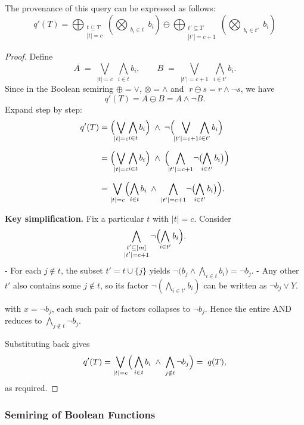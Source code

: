 \documentclass[twocolumn]{article}
\begin{document}
The provenance of this query can be expressed as follows:
\[
q'(T) = \bigoplus_{\substack{t\subseteq T \\ |t| = c}}\left(\bigotimes_{\substack{b_i\in t}}b_i\right) \ominus \bigoplus_{\substack{t'\subseteq T \\ |t'| = c+1}}\left(\bigotimes_{\substack{b_i\in t'}}b_i\right)
\]

\begin{proof}
Define
\[
A \;=\; \bigvee_{\lvert t\rvert = c}\;\bigwedge_{i\in t} b_i,
\qquad
B \;=\; \bigvee_{\lvert t'\rvert = c+1}\;\bigwedge_{i\in t'} b_i.
\]
Since in the Boolean semiring \(\oplus=\vee\), \(\otimes=\wedge\) and
\(\;r\ominus s = r\wedge\neg s\), we have
\[
q'(T)
= A \ominus B
= A \wedge \neg B.
\]
Expand step by step:
\begin{align*}
q'(T)
&= \Bigl(\!\bigvee_{\lvert t\rvert = c}\!\bigwedge_{i\in t}b_i\Bigr)
   \;\wedge\;
   \neg\Bigl(\!\bigvee_{\lvert t'\rvert = c+1}\!\bigwedge_{i\in t'}b_i\Bigr)\\[6pt]
&= \Bigl(\!\bigvee_{\lvert t\rvert = c}\!\bigwedge_{i\in t}b_i\Bigr)
   \;\wedge\;
   \Bigl(\!\bigwedge_{\lvert t'\rvert = c+1}\!\neg\bigl(\!\bigwedge_{i\in t'}b_i\bigr)\Bigr)\\[6pt]
&= \bigvee_{\lvert t\rvert = c}
    \Bigl(
      \bigwedge_{i\in t}b_i
      \;\wedge\;
      \bigwedge_{|t'|=c+1}\!\neg\bigl(\!\bigwedge_{i\in t'}b_i\bigr)
    \Bigr).
\end{align*}

\textbf{Key simplification.}  Fix a particular \(t\) with \(\lvert t\rvert=c\).  Consider
\[
\bigwedge_{\substack{t'\subseteq[m]\\|t'|=c+1}}
\neg\Bigl(\!\bigwedge_{i\in t'}b_i\Bigr).
\]
- For each \(j\notin t\), the subset \(t'=t\cup\{j\}\) yields
  \(\neg\bigl(b_j\wedge\bigwedge_{i\in t}b_i\bigr)=\neg b_j\).  
- Any other \(t'\) also contains some \(j\notin t\), so its factor
  \(\neg(\bigwedge_{i\in t'}b_i)\) can be written as
  \(\neg b_j\vee Y\).  

with \(x=\neg b_j\), each such pair of factors collapses to \(\neg b_j\).  Hence the entire
AND reduces to
\(\bigwedge_{j\notin t}\neg b_j\).

Substituting back gives
\[
q'(T)
=\bigvee_{\lvert t\rvert = c}
\Bigl(\,\bigwedge_{i\in t}b_i
       \;\wedge\;
       \bigwedge_{j\notin t}\neg b_j
\Bigr)
=\;q(T),
\]
as required.
\end{proof}

\subsubsection{Semiring of Boolean Functions}
\end{document}
